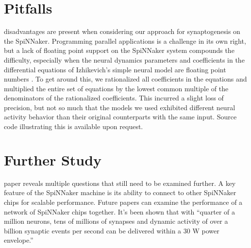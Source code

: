 \documentclass[journal]{./sty/IEEEtran}
\begin{document}

\section{Pitfalls}
 disadvantages are present when considering our approach 
for synaptogenesis on the SpiNNaker. 
Programming parallel applications is a challenge in its own right, 
but a lack of floating point support on the 
SpiNNaker system \cite{ArchOverV:Furber} compounds the difficulty, 
especially when the neural dynamics parameters and coefficients in the differential equations 
of Izhikevich's simple neural model are floating point numbers \cite{Spikes:Izhi}. 
To get around this, we rationalized all coefficients in the equations and multiplied the 
entire set of equations by the lowest common multiple of the denominators of 
the rationalized coefficients. 
This incurred a slight loss of precision, but not so much that the models we 
used exhibited different neural activity behavior than their original counterparts 
with the same input. 
Source code illustrating this is available upon request.

\section{Further Study}
 paper reveals multiple questions that still need to be examined further. 
A key feature of the SpiNNaker machine is its ability to connect to other SpiNNaker chips for scalable performance.
Future papers can examine the performance of a network of SpiNNaker chips together.
It's been shown that with ``quarter of a million neurons, 
tens of millions of synapses and dynamic activity of over a billion synaptic events per second can be delivered within a 30 W power envelope.''




%
\end{document}
